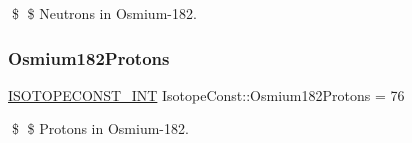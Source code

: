 \$ \$ Neutrons in Osmium-\/182. \mbox{\label{group___isotope_const-_osmium-_os182_gad20a5b4bb919ec5e5eb0d1d548baabfb}} 
\subsubsection{\texorpdfstring{Osmium182\+Protons}{Osmium182Protons}}
{\footnotesize\ttfamily \mbox{\hyperlink{group___isotope_const-_macros_ga5f18360b3e99483a35c32d789e62621c}{I\+S\+O\+T\+O\+P\+E\+C\+O\+N\+S\+T\+\_\+\+I\+NT}} Isotope\+Const\+::\+Osmium182\+Protons = 76}

\$ \$ Protons in Osmium-\/182. 